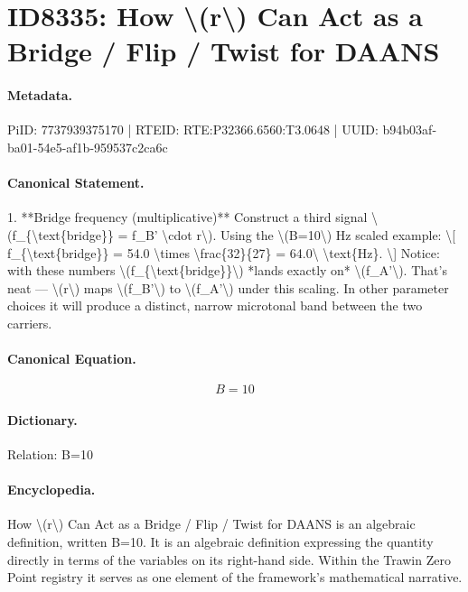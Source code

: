 \section*{ID8335: How \textbackslash{}(r\textbackslash{}) Can Act as a Bridge / Flip / Twist for DAANS}
\paragraph{Metadata.}
PiID: 7737939375170 | RTEID: RTE:P32366.6560:T3.0648 | UUID: b94b03af-ba01-54e5-af1b-959537c2ca6c

\paragraph{Canonical Statement.}
1. **Bridge frequency (multiplicative)** Construct a third signal \textbackslash{}(f\_\{\textbackslash{}text\{bridge\}\} = f\_B' \textbackslash{}cdot r\textbackslash{}). Using the \textbackslash{}(B=10\textbackslash{}) Hz scaled example: \textbackslash{}[ f\_\{\textbackslash{}text\{bridge\}\} = 54.0 \textbackslash{}times \textbackslash{}frac\{32\}\{27\} = 64.0\textbackslash{} \textbackslash{}text\{Hz\}. \textbackslash{}] Notice: with these numbers \textbackslash{}(f\_\{\textbackslash{}text\{bridge\}\}\textbackslash{}) *lands exactly on* \textbackslash{}(f\_A'\textbackslash{}). That’s neat — \textbackslash{}(r\textbackslash{}) maps \textbackslash{}(f\_B'\textbackslash{}) to \textbackslash{}(f\_A'\textbackslash{}) under this scaling. In other parameter choices it will produce a distinct, narrow microtonal band between the two carriers.

\paragraph{Canonical Equation.}
\[
B=10
\]

\paragraph{Dictionary.}
Relation: B=10

\paragraph{Encyclopedia.}
How \textbackslash{}(r\textbackslash{}) Can Act as a Bridge / Flip / Twist for DAANS is an algebraic definition, written B=10. It is an algebraic definition expressing the quantity directly in terms of the variables on its right-hand side. Within the Trawin Zero Point registry it serves as one element of the framework's mathematical narrative.
